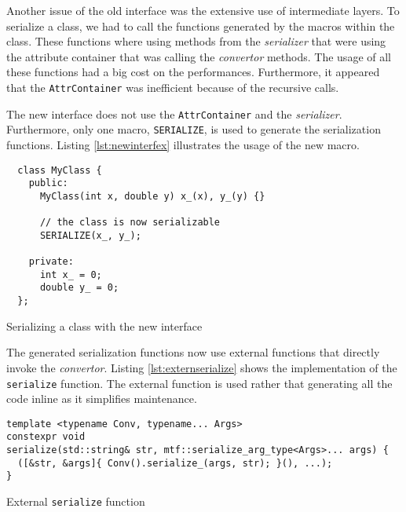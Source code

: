 Another issue of the old interface was the extensive use of intermediate layers.
To serialize a class, we had to call the functions generated by the macros
within the class. These functions where using methods from the
\textit{serializer} that were using the attribute container that was calling the
\textit{convertor} methods. The usage of all these functions had a big cost on
the performances. Furthermore, it appeared that the \texttt{AttrContainer} was
inefficient because of the recursive calls.

The new interface does not use the \texttt{AttrContainer} and the
\textit{serializer}. Furthermore, only one macro, \texttt{SERIALIZE}, is used to
generate the serialization functions. Listing \ref{lst:newinterfex} illustrates
the usage of the new macro.

\begin{listing}[ht!]
\begin{verbatim}
  class MyClass {
    public:
      MyClass(int x, double y) x_(x), y_(y) {}

      // the class is now serializable
      SERIALIZE(x_, y_);

    private:
      int x_ = 0;
      double y_ = 0;
  };
\end{verbatim}
\caption{Serializing a class with the new interface}
\label{lst:newinterfex}
\end{listing}

The generated serialization functions now use external functions that directly
invoke the \textit{convertor}. Listing \ref{lst:externserialize} shows the
implementation of the \texttt{serialize} function. The external function is used
rather that generating all the code inline as it simplifies maintenance.

\begin{listing}[ht!]
\begin{verbatim}
template <typename Conv, typename... Args>
constexpr void
serialize(std::string& str, mtf::serialize_arg_type<Args>... args) {
  ([&str, &args]{ Conv().serialize_(args, str); }(), ...);
}
\end{verbatim}
\caption{External \texttt{serialize} function}
\label{lst:externserialize}
\end{listing}

